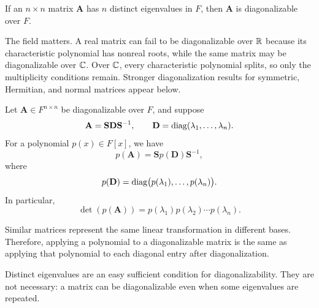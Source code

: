     \begin{corollary}
        If an $n\times n$ matrix $\mathbf{A}$ has $n$ distinct eigenvalues in
        $F$, then $\mathbf{A}$ is diagonalizable over $F$.
    \end{corollary}

    \begin{remark}
        The field matters. A real matrix can fail to be diagonalizable over
        $\mathbb{R}$ because its characteristic polynomial has nonreal roots, while the
        same matrix may be diagonalizable over $\mathbb{C}$. Over $\mathbb{C}$, every
        characteristic polynomial splits, so only the multiplicity conditions
        remain. Stronger diagonalization results for symmetric, Hermitian, and
        normal matrices appear below.
    \end{remark}

    \begin{proposition}
        Let $\mathbf{A}\in F^{n\times n}$ be diagonalizable over $F$, and suppose
        \[
            \mathbf{A}
            =
            \mathbf{S}\mathbf{D}\mathbf{S}^{-1},
            \qquad
            \mathbf{D}
            =
            \operatorname{diag}(\lambda_1,\dots,\lambda_n).
        \]
        For a polynomial $p(x)\in F[x]$, we have
        \[
            p(\mathbf{A})
            =
            \mathbf{S}p(\mathbf{D})\mathbf{S}^{-1},
        \]
        where
        \[
            p(\mathbf{D})
            =
            \operatorname{diag}\bigl(p(\lambda_1),\dots,p(\lambda_n)\bigr).
        \]
        In particular,
        \[
            \det(p(\mathbf{A}))
            =
            p(\lambda_1)p(\lambda_2)\cdots p(\lambda_n).
        \]
    \end{proposition}

    \begin{idea}
        Similar matrices represent the same linear transformation in different
        bases. Therefore, applying a polynomial to a diagonalizable matrix is
        the same as applying that polynomial to each diagonal entry after
        diagonalization.
    \end{idea}

    \begin{strategy}
        Distinct eigenvalues are an easy sufficient condition for
        diagonalizability. They are not necessary: a matrix can be
        diagonalizable even when some eigenvalues are repeated.
    \end{strategy}

